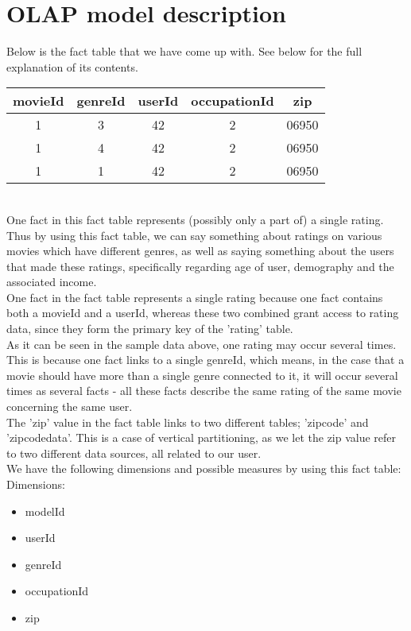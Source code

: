 \section*{OLAP model description}

\noindent Below is the fact table that we have come up with. See below for the full explanation of its contents.

\begin{tabular}{c | c | c | c | c}
  movieId & genreId & userId & occupationId & zip \\
  \hline
  1 & 3 & 42 & 2 & 06950 \\
  1 & 4 & 42 & 2 & 06950 \\
  1 & 1 & 42 & 2 & 06950 \\
  \hline  
\end{tabular} \\

\noindent One fact in this fact table represents (possibly only a part of) a single rating. Thus by using this fact table, we can say something about ratings on various movies which have different genres, as well as saying something about the users that made these ratings, specifically regarding age of user, demography and the associated income. \\
One fact in the fact table represents a single rating because one fact contains both a movieId and a userId, whereas these two combined grant access to rating data, since they form the primary key of the 'rating' table. \\
As it can be seen in the sample data above, one rating may occur several times. This is because one fact links to a single genreId, which means, in the case that a movie should have more than a single genre connected to it, it will occur several times as several facts - all these facts describe the same rating of the same movie concerning the same user. \\
The 'zip' value in the fact table links to two different tables; 'zipcode' and 'zipcodedata'. This is a case of vertical partitioning, as we let the zip value refer to two different data sources, all related to our user. \\

\noindent We have the following dimensions and possible measures by using this fact table: \\
Dimensions:

\begin{itemize}
  \item modelId
  \item userId
  \item genreId
  \item occupationId
  \item zip
\end{itemize}

